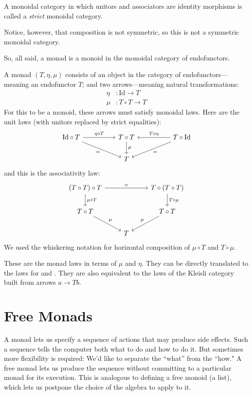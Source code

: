 \documentclass[DaoFP]{subfiles}
\begin{document}
A monoidal category in which unitors and associators are identity morphisms is called a \emph{strict} monoidal category.

Notice, however, that composition is not symmetric, so this is not a symmetric monoidal category.

So, all said, a monad is a monoid in the monoidal category of endofunctors. 

A monad $(T, \eta, \mu)$ consists of an object in the category of endofunctors---meaning an endofunctor $T$; and two arrows---meaning natural transformations:
\begin{align*}
 \eta &\colon \text{Id} \to T \\
 \mu &\colon T \circ T \to T 
\end{align*}
For this to be a monoid, these arrows must satisfy monoidal laws. Here are the unit laws (with unitors replaced by strict equalities):
\[
 \begin{tikzcd}
\text{Id} \circ T
 \arrow[rr, "\eta \circ T"]
 \arrow[rrd, "="']
& & T \circ T
 \arrow[d, "\mu"]
&& T \circ \text{Id}
 \arrow[ll, "T \circ \eta"']
 \arrow[lld, "="]
 \\
 && T
  \end{tikzcd}
\]
and this is the associativity law:
\[
 \begin{tikzcd}
 (T \circ T) \circ T 
 \arrow[rr, "="]
 \arrow[d, "\mu \circ T"]
 &&
 T \circ (T \circ T)
 \arrow[d, "T \circ \mu"]
 \\
 T \circ T 
 \arrow[dr, "\mu"]
& & T \circ T
 \arrow[dl, "\mu"']
 \\
&  T
 \end{tikzcd}
\]
We used the whiskering notation for horizontal composition of $\mu \circ T$ and $T \circ \mu$.

These are the monad laws in terms of $\mu$ and $\eta$. They can be directly translated to the laws for  and . They are also equivalent to the laws of the Kleisli category built from arrows $a \to T b$.

\section{Free Monads}

A monad lets us specify a sequence of actions that may produce side effects. Such a sequence tells the computer both what to do and how to do it. But sometimes more flexibility is required: We'd like to separate the ``what'' from the ``how." A free monad lets us produce the sequence without committing to a particular monad for its execution. This is analogous to defining a free monoid (a list), which lets us postpone the choice of the algebra to apply to it.
\end{document}
